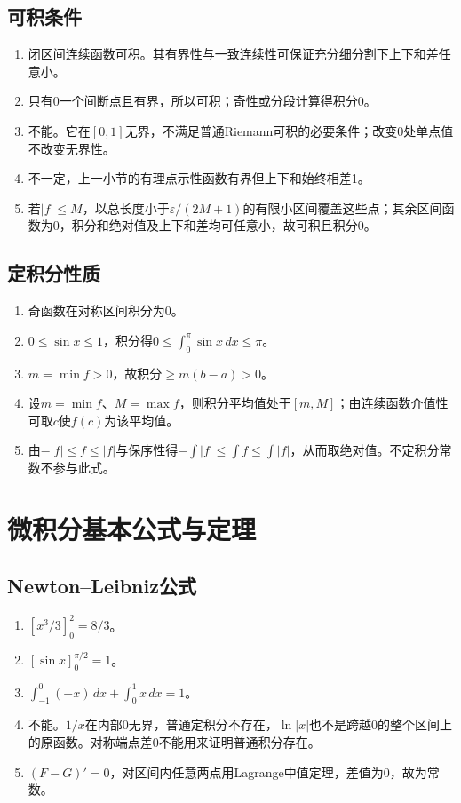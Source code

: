 \documentclass[11pt,a4paper,fontset=fandol]{ctexrep}
\begin{document}
\subsection{可积条件}
\begin{enumerate}
\item 闭区间连续函数可积。其有界性与一致连续性可保证充分细分割下上下和差任意小。
\item 只有0一个间断点且有界，所以可积；奇性或分段计算得积分0。
\item 不能。它在$[0,1]$无界，不满足普通Riemann可积的必要条件；改变0处单点值不改变无界性。
\item 不一定，上一小节的有理点示性函数有界但上下和始终相差1。
\item 若$|f|\le M$，以总长度小于$\varepsilon/(2M+1)$的有限小区间覆盖这些点；其余区间函数为0，积分和绝对值及上下和差均可任意小，故可积且积分0。
\end{enumerate}
\subsection{定积分性质}
\begin{enumerate}
\item 奇函数在对称区间积分为0。
\item $0\le\sin x\le1$，积分得$0\le\int_0^\pi\sin x\,dx\le\pi$。
\item $m=\min f>0$，故积分$\ge m(b-a)>0$。
\item 设$m=\min f$、$M=\max f$，则积分平均值处于$[m,M]$；由连续函数介值性可取$c$使$f(c)$为该平均值。
\item 由$-|f|\le f\le|f|$与保序性得$-\int|f|\le\int f\le\int|f|$，从而取绝对值。不定积分常数不参与此式。
\end{enumerate}
\section{微积分基本公式与定理}
\subsection{Newton--Leibniz公式}
\begin{enumerate}
\item $[x^3/3]_0^2=8/3$。
\item $[\sin x]_0^{\pi/2}=1$。
\item $\int_{-1}^0(-x)\,dx+\int_0^1x\,dx=1$。
\item 不能。$1/x$在内部0无界，普通定积分不存在，$\ln|x|$也不是跨越0的整个区间上的原函数。对称端点差0不能用来证明普通积分存在。
\item $(F-G)'=0$，对区间内任意两点用Lagrange中值定理，差值为0，故为常数。
\end{enumerate}
\end{document}
